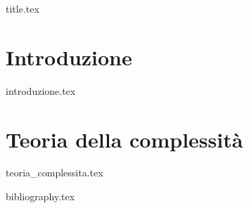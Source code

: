 \documentclass[a4paper,11pt,oneside]{book}
\begin{document}
\frontmatter

{title.tex}

\tableofcontents

\mainmatter


\chapter{Introduzione}
{introduzione.tex}


\chapter{Teoria della complessità}
{teoria_complessita.tex}

\cleardoublepage

{bibliography.tex}
\end{document}
